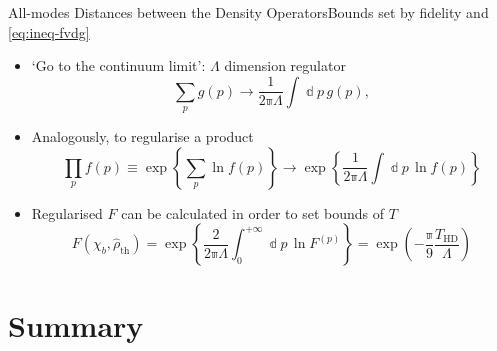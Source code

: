 \documentclass{beamer}
\newcommand{\pp}{{\Bbbpi}}
\newcommand{\rbr}[1]{{\left(#1\right)}}
\newcommand{\rfun}[2]{{#1}\mathopen{}\left(#2\right)\mathclose{}}
\newcommand{\cfun}[2]{{#1}\mathopen{}\left\{#2\right\}\mathclose{}}
\newcommand{\dd}{\Bbbd}
\newcommand{\what}[1]{{\widehat{#1}}}
\begin{document}
\begin{frame}[allowframebreaks]{All-modes Distances between the Density 
Operators}{Bounds set by fidelity and \cref{eq:ineq-fvdg}}

\begin{itemize}

\item `Go to the continuum limit': $\Lambda$ dimension regulator
\begin{equation}
\sum_p \rfun{g}{p} \to \frac{1}{2\pp\Lambda} \int \dd p\,\rfun{g}{p},
\end{equation}

\item Analogously, to regularise a product
\begin{equation}
\prod_p \rfun{f}{p} \equiv \cfun{\exp}{\sum_p 
\ln\rfun{f}{p}} \to \cfun{\exp}{\frac{1}{2\pp\Lambda}
\int \dd p\,\ln\rfun{f}{p}}
\end{equation}

\item Regularised $F$ can be calculated \alert{in order to set bounds of $T$}
\begin{equation}
\rfun{F}{\chi_b, \what{\rho}_\text{th}} = 
\cfun{\exp}{\frac{2}{2\pp\Lambda}\int_0^{+\infty}\dd p\,\ln F^{\rbr{p}}} =
\rfun{\exp}{-\frac{\pp}{9} \frac{T_\text{HD}}{\Lambda}}
\end{equation}
\end{itemize}


\begin{center}

\end{center}

\end{frame}



\section*{Summary}
\end{document}

